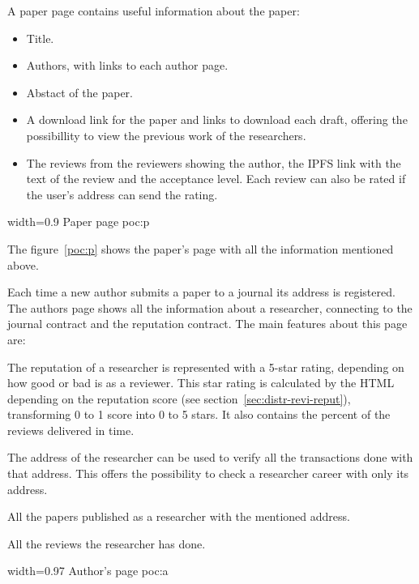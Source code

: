 

A paper page contains useful information about the paper:
\begin{itemize}
\item Title.
\item Authors, with links to each author page.
\item Abstact of the paper.
\item A download link for the paper and links to download each draft, offering
  the possibillity to view the previous work of the researchers.
\item The reviews from the reviewers showing the author, the IPFS link with the text of the review
  and the acceptance level. Each review can also be rated if the user's address
  can send  the rating.
\end{itemize}
%
{width=0.9\linewidth}%
{Paper page}%
{poc:p}

The figure~\ref{poc:p} shows the paper's page with all the information mentioned
above.


Each time a new author submits a paper to a journal its address is registered.
The authors page shows all the information about a researcher, connecting to the
journal contract and the reputation contract. The main features about this page
are:

\begin{itemize}
   The reputation of a researcher is represented with a 5-star
  rating, depending on how good or bad is as a reviewer. This star rating is
  calculated by the HTML depending on the reputation score (see section~\ref{sec:distr-revi-reput}),
  transforming 0 to 1 score into 0 to 5 stars. It also contains the percent of
  the reviews delivered in time.

   The address of the researcher can be used to verify
  all the transactions done with that address. This offers the possibility to
  check a researcher career with only its address.

   All the papers published as a researcher with the
  mentioned address.

   All the reviews the researcher has done. 
\end{itemize}

%
{width=0.97\linewidth}%
{Author's page}%
{poc:a}

